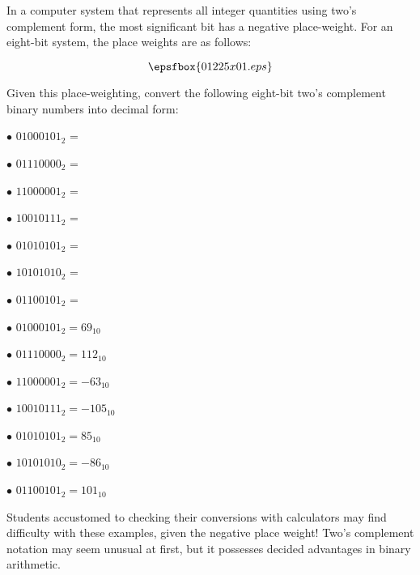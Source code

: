 

In a computer system that represents all integer quantities using two's complement form, the most significant bit has a negative place-weight.  For an eight-bit system, the place weights are as follows:

\vskip 20pt

$$\epsfbox{01225x01.eps}$$

Given this place-weighting, convert the following eight-bit two's complement binary numbers into decimal form:

\medskip
\item{$\bullet$} $01000101_2$ = 
\item{$\bullet$} $01110000_2$ = 
\item{$\bullet$} $11000001_2$ = 
\item{$\bullet$} $10010111_2$ = 
\item{$\bullet$} $01010101_2$ = 
\item{$\bullet$} $10101010_2$ = 
\item{$\bullet$} $01100101_2$ = 
\medskip







\medskip
\item{$\bullet$} $01000101_2 = 69_{10}$
\item{$\bullet$} $01110000_2 = 112_{10}$
\item{$\bullet$} $11000001_2 = -63_{10}$
\item{$\bullet$} $10010111_2 = -105_{10}$
\item{$\bullet$} $01010101_2 = 85_{10}$
\item{$\bullet$} $10101010_2 = -86_{10}$
\item{$\bullet$} $01100101_2 = 101_{10}$
\medskip







Students accustomed to checking their conversions with calculators may find difficulty with these examples, given the negative place weight!  Two's complement notation may seem unusual at first, but it possesses decided advantages in binary arithmetic.




